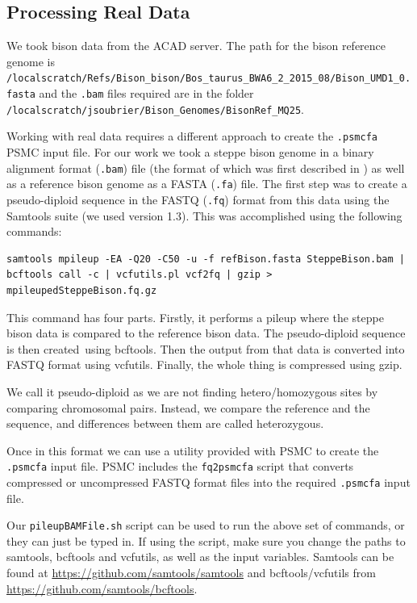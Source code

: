 \documentclass[11pt,a4paper]{article}
\begin{document}
\subsection{Processing Real Data}
We took bison data from the ACAD server. The path for the bison reference genome is \verb|/localscratch/Refs/Bison_bison/Bos_taurus_BWA6_2_2015_08/Bison_UMD1_0.fasta| and the \verb|.bam| files required are in the folder \verb|/localscratch/jsoubrier/Bison_Genomes/BisonRef_MQ25|.

Working with real data requires a different approach to create the \verb|.psmcfa| PSMC input file. For our work we took a steppe bison genome in a binary alignment format (\verb|.bam|) file (the format of which was first described in \cite{li2009sequence}) as well as a reference bison genome as a FASTA (\verb|.fa|) file. The first step was to create a pseudo-diploid sequence in the FASTQ (\verb|.fq|) format from this data using the Samtools suite (we used version 1.3). This was accomplished using the following commands:
\begin{lstlisting}
samtools mpileup -EA -Q20 -C50 -u -f refBison.fasta SteppeBison.bam | bcftools call -c | vcfutils.pl vcf2fq | gzip > mpileupedSteppeBison.fq.gz
\end{lstlisting}
This command has four parts. Firstly, it performs a pileup where the steppe bison data is compared to the reference bison data. The pseudo-diploid sequence is then created\ using bcftools.  Then the output from that data is converted into FASTQ format using vcfutils. Finally, the whole thing is compressed using gzip. 

We call it pseudo-diploid as we are not finding hetero/homozygous sites by comparing chromosomal pairs. Instead, we compare the reference and the sequence, and differences between them are called heterozygous.

Once in this format we can use a utility provided with PSMC to create the \verb|.psmcfa| input file. PSMC includes the \verb|fq2psmcfa| script that converts compressed or uncompressed FASTQ format files into the required \verb|.psmcfa| input file.

Our \verb|pileupBAMFile.sh| script can be used to run the above set of commands, or they can just be typed in. If using the script, make sure you change the paths to samtools, bcftools and vcfutils, as well as the input variables. Samtools can be found at \url{https://github.com/samtools/samtools} and bcftools/vcfutils from \url{https://github.com/samtools/bcftools}.
\end{document}
